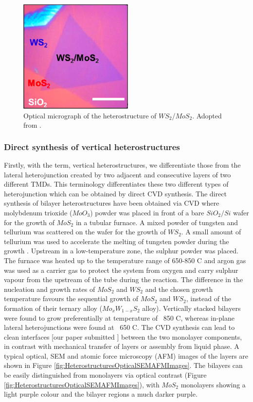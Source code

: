\begin{figure}[h]
	\begin{center}
		\includegraphics[scale=1]{Heterostructures/HeterostructureOpticalMap.png}
		\caption{Optical micrograph of the heterostructure of $WS_2$/$MoS_2$. Adopted from \cite{Tongay2014}.}
		\label{fig:HeterostructuresOpticalMap}
	\end{center}
\end{figure}

\subsubsection{Direct synthesis of vertical heterostructures}

Firstly, with the term, vertical heterostructures, we differentiate those from the lateral heterojunction created by two adjacent and consecutive layers of two different TMDs.
This terminology differentiates these two different types of heterojunction which can be obtained by direct CVD synthesis.
The direct synthesis of bilayer heterostructures have been obtained via CVD where molybdenum trioxide ($MoO_3$) powder was placed in  front of a bare $SiO_2/Si$ wafer for the growth of $MoS_2$ in a tubular furnace. A mixed powder of tungsten and tellurium was scattered on the wafer for the growth of $WS_2$. A small amount of tellurium was used to accelerate the melting of tungsten powder during the growth \cite{Gong2014}. Upstream in a low-temperature zone, the sulphur powder was placed. The furnace was heated up to the temperature range of 650-850 {\degree}C and argon gas was used as a carrier gas to protect the system from oxygen and carry sulphur vapour from the upstream of the tube during the reaction. The difference in the nucleation and growth rates of $MoS_2$ and $WS_2$ and the chosen growth temperature favours the sequential growth of $MoS_2$ and $WS_2$, instead of  the formation of their ternary alloy ($Mo_xW_{1-x}S_2$ alloy). Vertically stacked bilayers were found to grow preferentially at temperature of ~850 {\degree}C, whereas in-plane lateral heterojunctions were found at ~650 {\degree}C. The CVD  synthesis can lead to clean interfaces \cite{Gong2014}[our paper submitted ] between the two monolayer components, in contrast with mechanical transfer of layers or assembly from liquid phase. A typical optical, SEM and atomic force microscopy (AFM) images of the layers are shown in Figure \ref{fig:HeterostructuresOpticalSEMAFMImages}. The bilayers can be easily distinguished from monolayers via optical contrast (Figure \ref{fig:HeterostructuresOpticalSEMAFMImages}), with $MoS_2$ monolayers showing a light purple colour and the bilayer regions a much darker purple.

